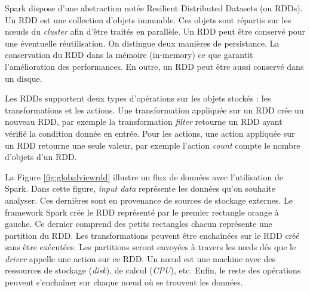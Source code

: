 Spark dispose d'une abstraction notée Resilient Distributed Datasets (ou RDDs). Un RDD est une collection d'objets immuable. Ces objets sont répartis sur les n\oe{}uds du \textit{cluster} afin d'être traités en parallèle. Un RDD peut être conservé  pour une éventuelle réutilisation. On distingue deux manières de persistance. La conservation du RDD dans la mémoire (in-memory) ce que garantit l'amélioration des performances. En outre, un RDD peut être aussi conservé dans un disque. 

Les RDDs supportent deux types d'opérations sur les objets stockés : les transformations et les actions. Une  transformation appliquée sur un RDD crée un nouveau RDD, par exemple la transformation \textit{filter} retourne un RDD ayant vérifié la condition donnée en entrée.  Pour les actions, une action appliquée sur un RDD retourne une seule valeur, par exemple l'action \textit{count} compte le nombre d'objets d'un RDD.





 La Figure 	\ref{fig:globalviewrdd} illustre un flux de données avec l'utilisation de Spark. Dans cette figure, \textit{input data} représente les données qu'on souhaite analyser. Ces dernières sont en provenance de sources de stockage externes. Le framework Spark crée le RDD représenté par le premier rectangle orange à gauche. Ce dernier  comprend  des petits rectangles chacun représente une partition du RDD.  Les transformations  peuvent être enchaînées sur le RDD créé sans être exécutées. Les partitions seront envoyées à travers les n\oe{}ds dés que le \textit{driver} appelle une action sur ce RDD. Un n\oe{}ud est une machine avec des ressources de stockage (\textit{disk}), de calcul (\textit{CPU}), etc. Enfin, le reste des opérations peuvent s'enchaîner  sur chaque n\oe{}ud où se trouvent les données.


